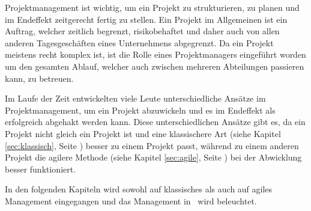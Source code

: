 
Projektmanagement ist wichtig, um ein Projekt zu strukturieren, zu planen und im Endeffekt zeitgerecht fertig zu stellen. Ein Projekt im Allgemeinen ist ein Auftrag, welcher zeitlich begrenzt, risikobehaftet und daher auch von allen anderen Tagesgeschäften eines Unternehmens abgegrenzt. Da ein Projekt meistens recht komplex ist, ist die Rolle eines Projektmanagers eingeführt worden um den gesamten Ablauf, welcher auch zwischen mehreren Abteilungen passieren kann, zu betreuen. \cite{Projectman.}

Im Laufe der Zeit entwickelten viele Leute unterschiedliche Ansätze im Projektmanagement, um ein Projekt abzuwickeln und es im Endeffekt als erfolgreich abgehakt werden kann. Diese unterschiedlichen Ansätze gibt es, da ein Projekt nicht gleich ein Projekt ist und eine klassischere Art (siehe Kapitel \ref{sec:klassisch}, Seite \pageref{sec:klassisch}) besser zu einem Projekt passt, während zu einem anderen Projekt die agilere Methode (siehe Kapitel \ref{sec:agile}, Seite \pageref{sec:agile}) bei der Abwicklung besser funktioniert. \cite{Projectman.}

In den folgenden Kapiteln wird sowohl auf klassisches als auch auf agiles Management eingegangen und das Management in \ZELIA\ wird beleuchtet. \cite{Projectman.}


